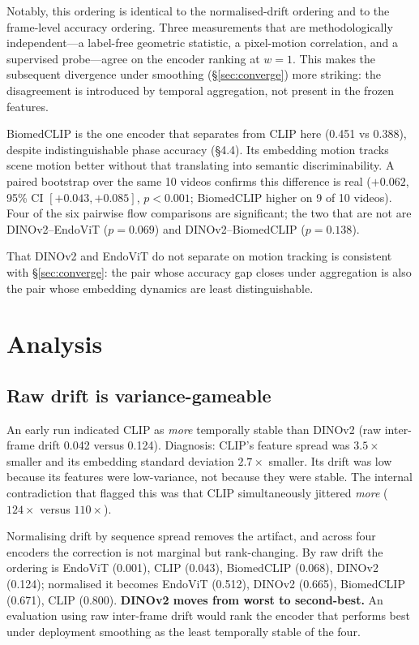 \documentclass[10pt,twocolumn]{article}
\begin{document}
Notably, this ordering is identical to the normalised-drift ordering and to
the frame-level accuracy ordering. Three measurements that are methodologically
independent---a label-free geometric statistic, a pixel-motion correlation, and
a supervised probe---agree on the encoder ranking at $w=1$. This makes the
subsequent divergence under smoothing (\S\ref{sec:converge}) more striking: the
disagreement is introduced by temporal aggregation, not present in the frozen
features.

BiomedCLIP is the one encoder that separates from CLIP here (0.451 vs 0.388),
despite indistinguishable phase accuracy (\S4.4). Its embedding motion tracks
scene motion better without that translating into semantic discriminability.
A paired bootstrap over the same 10 videos confirms this difference is real
($+0.062$, 95\% CI $[+0.043, +0.085]$, $p<0.001$; BiomedCLIP higher on 9 of 10
videos). Four of the six pairwise flow comparisons are significant; the two
that are not are DINOv2--EndoViT ($p=0.069$) and DINOv2--BiomedCLIP
($p=0.138$).

That DINOv2 and EndoViT do not separate on motion tracking is consistent with
\S\ref{sec:converge}: the pair whose accuracy gap closes under aggregation is
also the pair whose embedding dynamics are least distinguishable.

\section{Analysis}

\subsection{Raw drift is variance-gameable}
\label{sec:variance}
An early run indicated CLIP as \emph{more} temporally stable than DINOv2 (raw
inter-frame drift 0.042 versus 0.124). Diagnosis: CLIP's feature spread was
$3.5\times$ smaller and its embedding standard deviation $2.7\times$ smaller.
Its drift was low because its features were low-variance, not because they were
stable. The internal contradiction that flagged this was that CLIP
simultaneously jittered \emph{more} ($124\times$ versus $110\times$).

Normalising drift by sequence spread removes the artifact, and across four
encoders the correction is not marginal but rank-changing. By raw drift the
ordering is EndoViT (0.001), CLIP (0.043), BiomedCLIP (0.068), DINOv2 (0.124);
normalised it becomes EndoViT (0.512), DINOv2 (0.665), BiomedCLIP (0.671), CLIP
(0.800). \textbf{DINOv2 moves from worst to second-best.} An evaluation using
raw inter-frame drift would rank the encoder that performs best under
deployment smoothing as the least temporally stable of the four.
\end{document}
